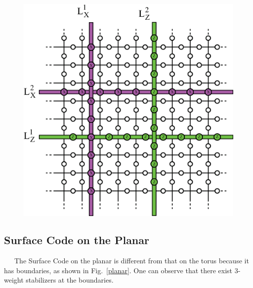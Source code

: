 \documentclass[a4paper,11pt]{ltjsarticle}
\begin{document}
{{    \begin{figure}[h]
        \centering
        \includegraphics[scale=0.40]{figure/logical_operator.eps}
        \vspace{0pt}\caption{}
        \label{logical_operator}
        \vspace{-10pt}
    \end{figure}
    \clearpage
    }


    \subsection{Surface Code on the Planar}{
        \ \ \ The Surface Code on the planar is different from that on the torus because it has boundaries, as shown in Fig.~\ref{planar}. One can observe that there exist 3-weight stabilizers at the boundaries. 

}}
\end{document}
